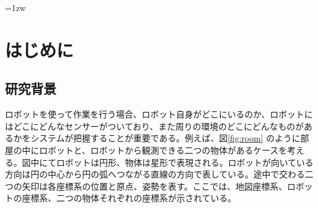 \documentclass[a4paper]{jreport}	%
\begin{document}
\makecover

\addtolength{\textheight}{-5mm}	%
\setlength{\footskip}{15mm}	%
\fontsize{11pt}{15pt}\selectfont

\pagebreak\setcounter{page}{1}
\pagestyle{plain}
\tableofcontents
\listoffigures

\parindent=1zw	%
\pagebreak\setcounter{page}{1}
\pagestyle{plain}




\chapter{はじめに}
\section{研究背景}



ロボットを使って作業を行う場合、ロボット自身がどこにいるのか、ロボットにはどこにどんなセンサーがついており、また周りの環境のどこにどんなものがあるかをシステムが把握することが重要である。例えば、図\ref{fig:room} のように部屋の中にロボットと、ロボットから観測できる二つの物体があるケースを考える。図中にてロボットは円形、物体は星形で表現される。ロボットが向いている方向は円の中心から円の弧へつながる直線の方向で表している。途中で交わる二つの矢印は各座標系の位置と原点、姿勢を表す。ここでは、地図座標系、ロボットの座標系、二つの物体それぞれの座標系が示されている。
\end{document}
